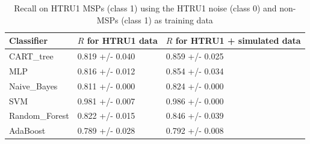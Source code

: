 \documentclass[12pt]{article}
\begin{document}
\begin{table}[h!]
\centering
{}
\caption{Recall on HTRU2 MSPs (class 1) using the HTRU2 noise (class 0) and non-MSPs (class 1) as training data}
\label{htru2}
\end{table}

\begin{table}[]
\centering
\begin{tabular}{|l|l|l|}
\hline
\textbf{Classifier} & \textbf{$R$ for HTRU1 data} & \textbf{$R$ for HTRU1 + simulated data} \\ \hline
CART\_tree          & 0.819 +/- 0.040                & 0.859 +/- 0.025                                 \\ \hline
MLP                 & 0.816 +/- 0.012                & 0.854 +/- 0.034                                 \\ \hline
Naive\_Bayes        & 0.811 +/- 0.000                & 0.824 +/- 0.000                                 \\ \hline
SVM                 & 0.981 +/- 0.007                & 0.986 +/- 0.000                                 \\ \hline
Random\_Forest      & 0.822 +/- 0.015                & 0.846 +/- 0.039                                 \\ \hline
AdaBoost            & 0.789 +/- 0.028                & 0.792 +/- 0.008                                 \\ \hline
\end{tabular}
\caption{Recall on HTRU1 MSPs (class 1) using the HTRU1 noise (class 0) and non-MSPs (class 1) as training data}
\label{htru2recall}
\end{table}
\end{document}
